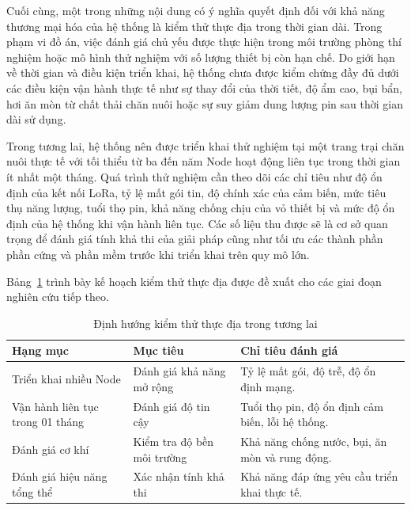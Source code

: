 Cuối cùng, một trong những nội dung có ý nghĩa quyết định đối với khả năng thương mại hóa của hệ thống là kiểm thử thực địa trong thời gian dài. Trong phạm vi đồ án, việc đánh giá chủ yếu được thực hiện trong môi trường phòng thí nghiệm hoặc mô hình thử nghiệm với số lượng thiết bị còn hạn chế. Do giới hạn về thời gian và điều kiện triển khai, hệ thống chưa được kiểm chứng đầy đủ dưới các điều kiện vận hành thực tế như sự thay đổi của thời tiết, độ ẩm cao, bụi bẩn, hơi ăn mòn từ chất thải chăn nuôi hoặc sự suy giảm dung lượng pin sau thời gian dài sử dụng.

Trong tương lai, hệ thống nên được triển khai thử nghiệm tại một trang trại chăn nuôi thực tế với tối thiểu từ ba đến năm Node hoạt động liên tục trong thời gian ít nhất một tháng. Quá trình thử nghiệm cần theo dõi các chỉ tiêu như độ ổn định của kết nối LoRa, tỷ lệ mất gói tin, độ chính xác của cảm biến, mức tiêu thụ năng lượng, tuổi thọ pin, khả năng chống chịu của vỏ thiết bị và mức độ ổn định của hệ thống khi vận hành liên tục. Các số liệu thu được sẽ là cơ sở quan trọng để đánh giá tính khả thi của giải pháp cũng như tối ưu các thành phần phần cứng và phần mềm trước khi triển khai trên quy mô lớn.

Bảng~\ref{tab:field_test_future} trình bày kế hoạch kiểm thử thực địa được đề xuất cho các giai đoạn nghiên cứu tiếp theo.

\begin{table}[H]
\centering
\caption{Định hướng kiểm thử thực địa trong tương lai}
\label{tab:field_test_future}
\begin{tabular}{p{4cm} p{4cm} p{6cm}}
\hline
\textbf{Hạng mục} &
\textbf{Mục tiêu} &
\textbf{Chỉ tiêu đánh giá} \\
\hline
Triển khai nhiều Node &
Đánh giá khả năng mở rộng &
Tỷ lệ mất gói, độ trễ, độ ổn định mạng. \\

Vận hành liên tục trong 01 tháng &
Đánh giá độ tin cậy &
Tuổi thọ pin, độ ổn định cảm biến, lỗi hệ thống. \\

Đánh giá cơ khí &
Kiểm tra độ bền môi trường &
Khả năng chống nước, bụi, ăn mòn và rung động. \\

Đánh giá hiệu năng tổng thể &
Xác nhận tính khả thi &
Khả năng đáp ứng yêu cầu triển khai thực tế. \\
\hline
\end{tabular}
\end{table}

